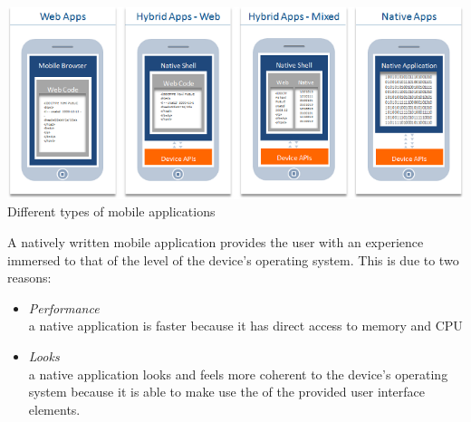 \begin{centering}
\includegraphics[scale=0.5]{images/apptypesdefined.png}\\{Different types of mobile applications\cite{IBM-Worklight2012}}\\
\end{centering}

A natively written mobile application provides the user with an experience immersed to that of the level of the device's operating system. This is due to two reasons:
\begin{itemize}
\item
\emph{Performance}\\
a native application is faster because it has direct access to memory and CPU
\item \emph{Looks}\\
a native application looks and feels more coherent to the device's operating system because it is able to make use the of the provided user interface elements.
\end{itemize}


